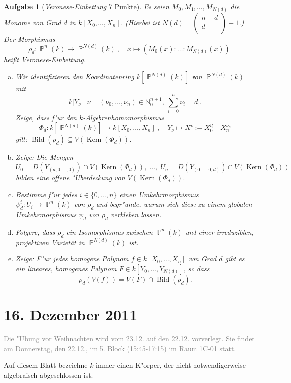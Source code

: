 \documentclass[a4paper, 12pt, numbers=noendperiod, chapterprefix=true]{scrbook}
\theoremstyle{break}
\newtheorem{Aufg}{Aufgabe}
\theoremstyle{nonumberbreak}
\theoremstyle{nonumberplain}
\newcommand{\quot}[1]{\textrm{\glqq}{#1}\textrm{\grqq}}
\newcommand{\textvector}[2]{\left(\begin{smallmatrix} #1\\ #2\\ \end{smallmatrix}\right)}
\DeclareMathOperator{\Kern}{Kern}
\DeclareMathOperator{\Bild}{Bild}
\newcommand{\N}{\mathbb{N}}
\newcommand{\A}{\mathbb{A}}
\DeclareMathOperator{\Projective}{\mathbb{P}} %
\begin{document}
\begin{Aufg}[\textit{Veronese-Einbettung} 7 Punkte]
Es seien $M_0,M_1,\dots, M_{N(d)}$ die Monome von Grad $d$ in $k[X_0,\dots,X_n]$. (Hierbei ist $N(d) = \textvector{n+d}{d}-1$.) Der Morphismus
	\[\rho_d :\Projective^n(k)\to \Projective^{N(d)}(k)\ ,\quad x\mapsto (M_0(x):\ldots :M_{N(d)}(x))\]
hei\ss t \emph{Veronese-Einbettung}.
\begin{enumerate}[a)]
	\item Wir identifizieren den Koordinatenring $k[\Projective^{N(d)}(k)]$ von $\Projective^{N(d)}(k)$ mit
		\[ k\bigl[Y_{\nu}\mid \nu = (\nu_0,\dots,\nu_n) \in \N_0^{n+1},\ \sum_{i=0}^{n} \nu_i = d\bigr].\]
	Zeige, dass f"ur den $k$-Algebrenhomomorphismus
		\[\Phi_d : k[\Projective^{N(d)}(k)] \to k[X_0,\dots,X_n]\ ,\quad Y_\nu \mapsto X^\nu := X_0^{\nu_0}\cdots X_n^{\nu_n}\]
	gilt: $\Bild(\rho_d)\subseteq V(\Kern(\Phi_d))$.
	\item Zeige: Die Mengen 
		\[U_0 = D(Y_{(d,0,\dots,0)})\cap V(\Kern(\Phi_d)),\; \dots,\; U_n = D(Y_{(0,\dots,0,d)})\cap V(\Kern(\Phi_d))\]
	bilden eine offene "Uberdeckung von $V(\Kern(\Phi_d))$.
	\item Bestimme f"ur jedes $i\in \{0,\dots, n\}$ einen Umkehrmorphismus $\psi_d^i:U_i \to \Projective^n(k)$ von $\rho_d$ und begr"unde, warum sich diese zu einem globalen Umkehrmorphismus $\psi_d$ von $\rho_d$ \quot{verkleben} lassen.
	\item Folgere, dass $\rho_d$ ein Isomorphismus zwischen $\Projective^n(k)$ und einer irreduziblen, projektiven Variet\"at in $\Projective^{N(d)}(k)$ ist.
	\item Zeige: F"ur jedes homogene Polynom $f\in k[X_0,\dots,X_n]$ von Grad $d$ gibt es ein lineares, homogenes Polynom $F\in k[Y_0,\dots,Y_{N(d)}]$, so dass
		\[\rho_d(V(f)) = V(F)\cap \Bild(\rho_d).\]
\end{enumerate}\end{Aufg}

\newpage
\section{16. Dezember 2011}
\setcounter{Aufg}{0}
\setcounter{Loes}{0}
\textcolor{gray}{Die "Ubung vor Weihnachten wird vom 23.12. auf den 22.12. vorverlegt. Sie findet am Donnerstag, den 22.12., im 5. Block (15:45-17:15) im Raum 1C-01 statt.}

Auf diesem Blatt bezeichne $k$ immer einen K"orper, der nicht notwendigerweise algebraisch abgeschlossen ist.
\end{document}
